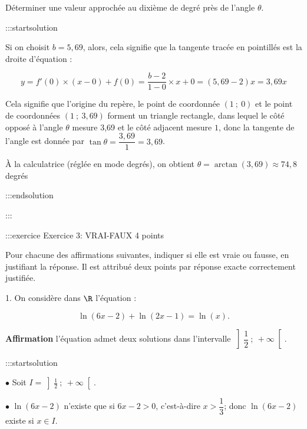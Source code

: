 \documentclass{cornouaille}
\begin{document}
Déterminer une valeur approchée au dixième de degré près de l'angle $\theta$.


:::startsolution

Si on choisit $b = 5,69$, alors, cela signifie que la tangente tracée en pointillés est la droite d'équation :

$$
y = f'(0) \times (x - 0) + f(0) = \dfrac{b - 2}{1 - 0} \times x + 0 = (5,69 - 2)x = 3,69x
$$

Cela signifie que l'origine du repère, le point de coordonnée $(1~;~0)$ et le point de coordonnées $(1~;~3,69)$ forment un triangle rectangle, dans lequel le côté opposé à l'angle $\theta$ mesure 3,69 et le côté adjacent mesure $1$, donc la tangente de l'angle est donnée par $\tan \theta = \dfrac{3,69}{1} = 3,69$.

À la calculatrice (réglée en mode degrés), on obtient $\theta = \arctan(3,69) \approx 74,8$ degrés


:::endsolution




:::






:::exercice Exercice 3: VRAI-FAUX 4 points


Pour chacune des  affirmations suivantes,
indiquer si elle est vraie ou fausse,
en justifiant la réponse.
Il est attribué deux points par réponse exacte correctement justifiée.







1.   On considère dans $\R$ l'équation :


$$
\ln (6 x - 2) + \ln (2x - 1) = \ln (x).
$$




\textbf{Affirmation} l'équation admet deux solutions dans l'intervalle $\left]\dfrac{1}{2}~;~+ \infty\right[$.


:::startsolution







$\bullet$  Soit $I=\left]\frac{1}{2}~;~+ \infty\right[$.






$\bullet$  $\ln\left (6x-2\right )$ n'existe que si $6x-2>0$, c'est-à-dire $x>\dfrac{1}{3}$; donc $\ln\left (6x-2\right )$ existe si $x\in I$.
\end{document}
